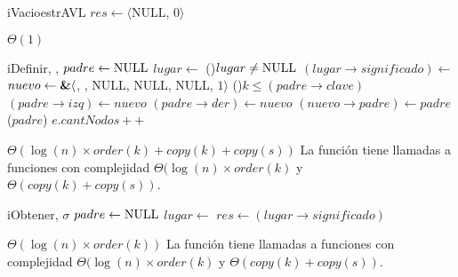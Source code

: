 \begin{Algoritmos}


  \begin{algoritmo}{iVacio}{}{estrAVL}
    $res \gets \langle$NULL, 0$\rangle$ 
  \end{algoritmo}
  \datosAlgoritmo{} %
  {} %
  {} %
  {$\Theta(1)$} %
  {} %

  \begin{algoritmo}{iDefinir}{, , }{}
     $padre \gets \textrm{NULL}$ 
     $lugar \gets$  
    \eIf(){$lugar \neq \textrm{NULL}$}{
      $(lugar \to significado) \gets$  
    }{
       $nuevo \gets \textbf{\&} \langle$, , NULL, NULL, NULL, $1 \rangle$  
      \eIf(){$k \leq (padre \to clave)$}{
        $(padre \to izq) \gets nuevo$ 
      }{
        $(padre \to der) \gets nuevo$ 
      }
      $(nuevo \to padre) \gets padre$ 
      \rebalancear($padre$) 
      $e.cantNodos ++$ 
    }
  \end{algoritmo}
  \datosAlgoritmo{} %
  {} %
  {} %
  {$\Theta(\log(n) \times order(k) + copy(k) + copy(s))$} %
  {La funci\'on tiene llamadas a funciones con complejidad $\Theta(\log(n) \times order(k)$ y $\Theta(copy(k) + copy(s))$.} %

  \begin{algoritmo}{iObtener}{, }{$\sigma$}
     $padre \gets \textrm{NULL}$ 
     $lugar \gets$  
    $res \gets (lugar \to significado)$ 
  \end{algoritmo}
  \datosAlgoritmo{} %
  {} %
  {} %
  {$\Theta(\log(n) \times order(k))$} %
  {La funci\'on tiene llamadas a funciones con complejidad $\Theta(\log(n) \times order(k)$ y $\Theta(copy(k) + copy(s))$.} %


\end{Algoritmos}
